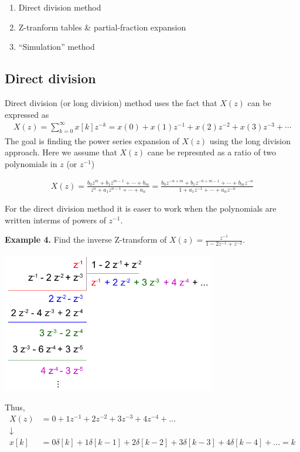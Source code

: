 \documentclass[twoside]{article}
\begin{document}
\begin{enumerate}
 \item Direct division method
 \item Z-tranform tables \& partial-fraction expansion 
 \item ``Simulation'' method
\end{enumerate}

\subsection*{Direct division}

Direct division (or long division) method uses the fact that $X(z)$
can be expressed as
%
\begin{align*}
  X(z) = \sum\limits_{k=0}^{\infty} x[k] z^{-k} = x(0) + x(1) z^{-1} +
  x(2) z^{-2} + x(3) z^{-3} + \cdots
\end{align*}
%
The goal is finding the power series expansion of $X(z)$ using the
long division approach. Here we assume that $X(z)$ cane be represnted
as a ratio of two polynomials in $z$ (or $z^{-1}$) 

\begin{align*}
  X(z) = \frac{b_0 z^m + b_1 z^{m-1} + \cdots + b_m}{z^n + a_1
  z^{n-1} + \cdots + a_n} = 
\frac{b_0 z^{-n+m} + b_1 z^{-n+m-1} + \cdots + b_m z^{-n}}{1 + a_1
  z^{-1} + \cdots + a_n z^{-n}} 
\end{align*}

For the direct division method it is easer to work when the
polynomials are written interms of powers of $z^{-1}$.

\textbf{Example 4.} Find the inverse Z-transform of $X(z) =
\frac{z^{-1}}{1 - 2 z^{-1} + z^{-2}}$.  

\begin{center}
  \begin{minipage}[h]{0.9\linewidth}
    \begin{center}
      \includegraphics[width=0.7\textwidth]{directdivision}
    \end{center}
  \end{minipage}
\end{center}
%
Thus, 
%
\begin{align*} 
  X(z) &= 0 + 1 z^{-1} + 2 z^{-2} + 3 z^{-3} + 4 z^{-4} + ...  \\
 \downarrow
\\
  x[k] &= 0 \delta[k] + 1 \delta[k-1] + 2 \delta[k-2] + 3 \delta[k-3] + 4
  \delta[k-4] + ...  = k
\end{align*}
%
\end{document}
